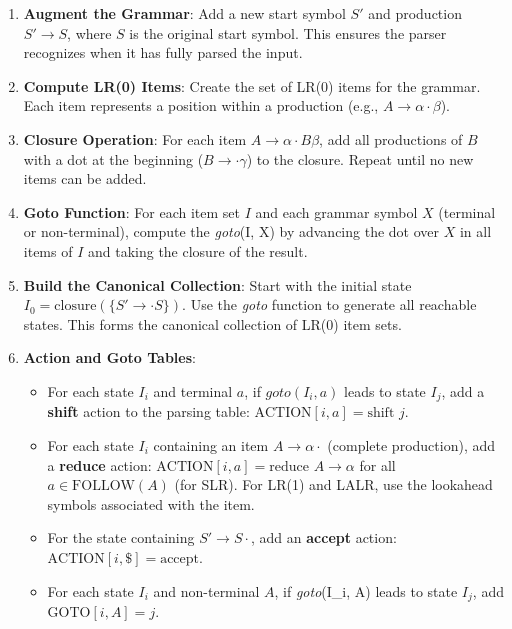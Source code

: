 \begin{enumerate}
  \item \textbf{Augment the Grammar}: Add a new start symbol \(S'\) and production \(S' \to S\), where \(S\) is the original start symbol. This ensures the parser recognizes when it has fully parsed the input.

  \item \textbf{Compute LR(0) Items}: Create the set of LR(0) items for the grammar. Each item represents a position within a production (e.g., \(A \to \alpha \cdot \beta\)).

  \item \textbf{Closure Operation}: For each item \(A \to \alpha \cdot B \beta\), add all productions of \(B\) with a dot at the beginning (\(B \to \cdot \gamma\)) to the closure. Repeat until no new items can be added.

  \item \textbf{Goto Function}: For each item set \(I\) and each grammar symbol \(X\) (terminal or non-terminal), compute the \textit{goto}(I, X) by advancing the dot over \(X\) in all items of \(I\) and taking the closure of the result.

  \item \textbf{Build the Canonical Collection}: Start with the initial state \(I_0 = \text{closure}(\{S' \to \cdot S\})\). Use the \textit{goto} function to generate all reachable states. This forms the canonical collection of LR(0) item sets.

  \item \textbf{Action and Goto Tables}:
  \begin{itemize}
    \item For each state $I_i$ and terminal $a$, if $\textit{goto}(I_i, a)$ leads to state \(I_j\), add a \textbf{shift} action to the parsing table: \(\text{ACTION}[i, a] = \text{shift } j\).
    \item For each state \(I_i\) containing an item \(A \to \alpha \cdot\) (complete production), add a \textbf{reduce} action: \(\text{ACTION}[i, a] = \text{reduce } A \to \alpha\) for all \(a \in \text{FOLLOW}(A)\) (for SLR). For LR(1) and LALR, use the lookahead symbols associated with the item.
    \item For the state containing \(S' \to S \cdot\), add an \textbf{accept} action: \(\text{ACTION}[i, \$] = \text{accept}\).
    \item For each state \(I_i\) and non-terminal \(A\), if \textit{goto}(I_i, A) leads to state \(I_j\), add \(\text{GOTO}[i, A] = j\).
  \end{itemize}


\end{enumerate}
